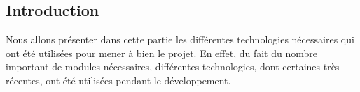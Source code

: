 \subsection{Introduction}
Nous allons présenter dans cette partie les différentes technologies nécessaires qui ont été utilisées pour mener à bien le projet. En effet, du fait du nombre important de modules nécessaires, différentes technologies, dont certaines très récentes, ont été utilisées pendant le développement.